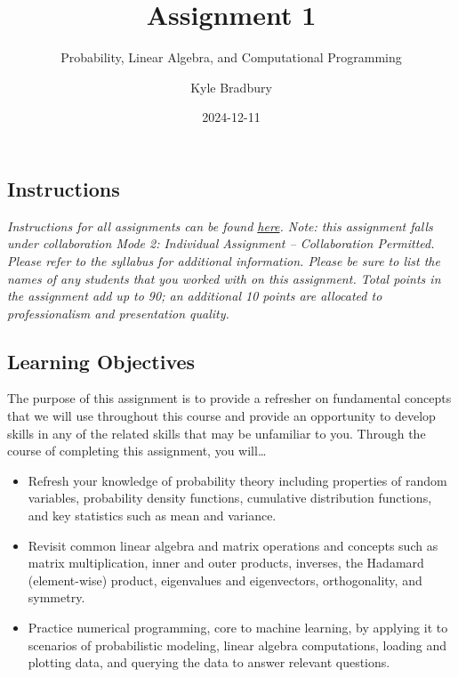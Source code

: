 \documentclass[
  letterpaper,
  DIV=11,
  numbers=noendperiod]{scrartcl}
\title{Assignment 1}
\subtitle{Probability, Linear Algebra, and Computational Programming}
\author{Kyle Bradbury}
\date{2024-12-11}
\providecommand{\tightlist}{%
  \setlength{\itemsep}{0pt}\setlength{\parskip}{0pt}}\usepackage{longtable,booktabs,array}
\renewcommand*\contentsname{Table of contents}
\newcommand\contentsname{Table of contents}
\begin{document}
\maketitle

\renewcommand*\contentsname{Table of contents}
{
\hypersetup{linkcolor=}
\setcounter{tocdepth}{1}
\tableofcontents
}

\subsection{Instructions}\label{instructions}

\emph{Instructions for all assignments can be found
\href{https://kylebradbury.github.io/ids705/notebooks/assignment_instructions.html}{here}.
Note: this assignment falls under collaboration Mode 2: Individual
Assignment -- Collaboration Permitted. Please refer to the syllabus for
additional information. Please be sure to list the names of any students
that you worked with on this assignment. Total points in the assignment
add up to 90; an additional 10 points are allocated to professionalism
and presentation quality.}

\subsection{Learning Objectives}\label{learning-objectives}

The purpose of this assignment is to provide a refresher on fundamental
concepts that we will use throughout this course and provide an
opportunity to develop skills in any of the related skills that may be
unfamiliar to you. Through the course of completing this assignment, you
will\ldots{}

\begin{itemize}
\tightlist
\item
  Refresh your knowledge of probability theory including properties of
  random variables, probability density functions, cumulative
  distribution functions, and key statistics such as mean and variance.
\item
  Revisit common linear algebra and matrix operations and concepts such
  as matrix multiplication, inner and outer products, inverses, the
  Hadamard (element-wise) product, eigenvalues and eigenvectors,
  orthogonality, and symmetry.
\item
  Practice numerical programming, core to machine learning, by applying
  it to scenarios of probabilistic modeling, linear algebra
  computations, loading and plotting data, and querying the data to
  answer relevant questions.
\end{itemize}
\end{document}

